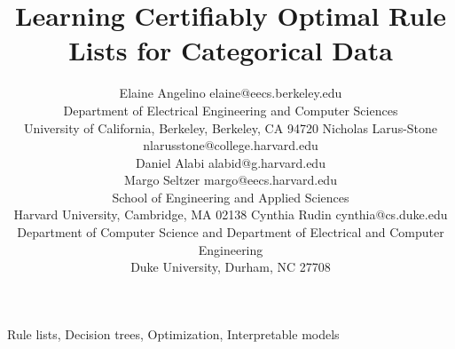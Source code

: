 \documentclass[twoside,11pt]{article}
\begin{document}
\title{Learning Certifiably Optimal Rule Lists for Categorical Data}

\author{\name Elaine Angelino \email elaine@eecs.berkeley.edu \\
        \addr Department of Electrical Engineering and Computer Sciences\\
        University of California, Berkeley,
        Berkeley, CA 94720
        \AND
        \name Nicholas Larus-Stone \email nlarusstone@college.harvard.edu \\
        \name Daniel Alabi \email alabid@g.harvard.edu \\
        \name Margo Seltzer \email margo@eecs.harvard.edu \\
        \addr School of Engineering and Applied Sciences\\
        Harvard University,
        Cambridge, MA 02138
        \AND
        \name Cynthia Rudin \email cynthia@cs.duke.edu \\
        \addr Department of Computer Science and
        Department of Electrical and Computer Engineering\\
        Duke University,
        Durham, NC 27708}


\maketitle

\begin{abstract}%

\end{abstract}

\begin{keywords}
    Rule lists, Decision trees, Optimization, Interpretable models
\end{keywords}
















\vskip 0.2in

\end{document}
